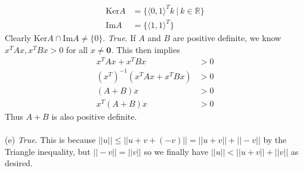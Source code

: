 \documentclass{article}
\begin{document}
\begin{align*}
    \text{Ker}A &= \{ \langle 0, 1\rangle^{T} k \ | \ k \in\mathbb{R}\}\\
    \text{Im}A &= \{\langle 1,1\rangle^{T}\}
\end{align*}
Clearly $\text{Ker}A \cap \text{Im}A \neq \{0\}$.
\newpage
{} \emph{True}. If $A$ and $B$ are positive definite, we know $x^{T}Ax, x^{T}Bx > 0$ for all $x \neq \mathbf{0}$. This then implies
\begin{align*}
    x^{T}Ax + x^{T}Bx &> 0\\
    (x^{T})^{-1}(x^{T}Ax + x^{T}Bx) &> 0\\
    (A+B)x &>0\\
    x^{T}(A+B)x &>0
\end{align*}
Thus $A+B$ is also positive definite.\\\\
(e) \emph{True}. This is because $||u|| \leq ||u + v + (-v)|| = ||u + v|| + ||-v|| $ by the Triangle inequality, but $||-v|| = ||v||$ so we finally have $||u|| < ||u+v|| + ||v||$ as desired.
\end{document}
